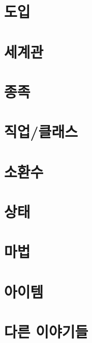 \documentclass{report}
\begin{document}
	\setcounter{parttocdepth}{3}
	\parttoc
	\setcounter{parttocdepth}{1}
	
	\chapter{도입}
		
	
	\chapter{세계관}
		
	
	\chapter{종족}
		
	
	\chapter{직업/클래스}
		
	
	\chapter{소환수}
		
	
	\chapter{상태}
		
	
	\chapter{마법}
		
	
	\chapter{아이템}
		
	
	\chapter{다른 이야기들}
		
\end{document}
